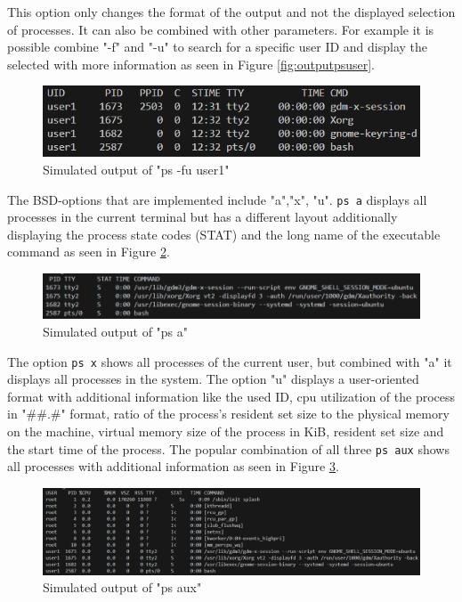 This option only changes the format of the output and not the displayed selection of processes. It can also be combined with other parameters. For example it is possible combine "-f" and "-u" to search for a specific user ID and display the selected with more information as seen in Figure \ref{fig:outputpsuser}. 

\begin{figure}[H]
    \centering
    \includegraphics[width=1\linewidth]{bilder/fake_psfu.png}
    \caption{Simulated output of "ps -fu user1"}
    \label{fig:outputpsuserl}
\end{figure}

The BSD-options that are implemented include "a","x", "u". \texttt{ps a} displays all processes in the current terminal but has a different layout additionally displaying the process state codes (STAT) and the long name of the executable command \cite{noauthor_ps1_2024} as seen in Figure \ref{fig:outputpsa}. 

\begin{figure}[H]
    \centering
    \includegraphics[width=1\linewidth]{bilder/fake_psa.png}
    \caption{Simulated output of "ps a"}
    \label{fig:outputpsa}
\end{figure}

The option \texttt{ps x} shows all processes of the current user, but combined with "a" it displays all processes in the system. The option "u" displays a user-oriented format with additional information like the used ID, cpu utilization of the process in "\#\#.\#" format, ratio of the process's resident set size to the physical memory on the machine, virtual memory size of the process in KiB, resident set size and the start time of the process. The popular combination of all three \texttt{ps aux} shows all processes with additional information \cite{noauthor_ps1_2024} as seen in Figure \ref{fig:fakepsaux}.

\begin{figure}[H]
    \centering
    \includegraphics[width=1\linewidth]{bilder/fake_psaux.png}
    \caption{Simulated output of "ps aux"}
    \label{fig:fakepsaux}
\end{figure}

